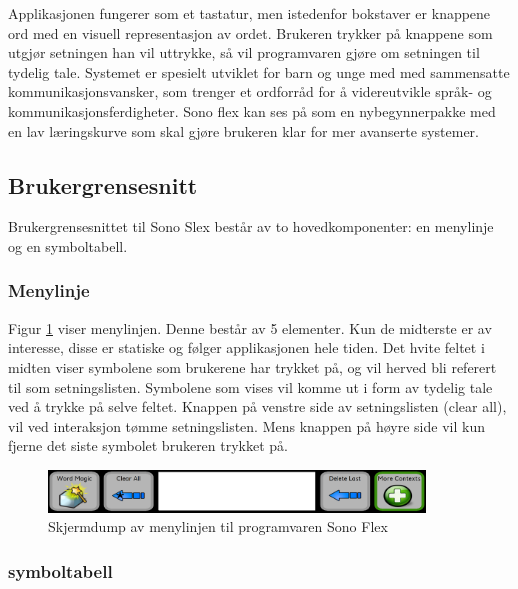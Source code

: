 \documentclass[phd,tocprelim]{cornell}
\begin{document}
Applikasjonen fungerer som et tastatur, men istedenfor bokstaver er knappene ord med en visuell representasjon av ordet. Brukeren trykker på knappene som utgjør setningen han vil uttrykke, så vil programvaren gjøre om setningen til tydelig tale.  Systemet er spesielt utviklet for barn og unge med med sammensatte kommunikasjonsvansker, som trenger et ordforråd for å videreutvikle språk- og kommunikasjonsferdigheter. Sono flex kan ses på som en nybegynnerpakke med en lav læringskurve som skal gjøre brukeren klar for mer avanserte systemer. 


\subsection{Brukergrensesnitt}

Brukergrensesnittet til Sono Slex består av to hovedkomponenter: en menylinje og en symboltabell. 


\subsubsection{Menylinje}

Figur \ref{fig:menylinje} viser menylinjen.  Denne består av 5 elementer.  Kun de midterste er av interesse, disse  er statiske og følger applikasjonen hele tiden. Det hvite feltet i midten viser symbolene som brukerene har trykket på, og vil herved bli referert til som setningslisten. Symbolene som vises vil komme ut i form av tydelig tale ved å trykke på selve feltet. Knappen på venstre side av setningslisten (clear all), vil ved interaksjon tømme setningslisten. Mens knappen på høyre side vil kun fjerne det siste symbolet brukeren trykket på.


\begin{figure}[ht!]
\centering
\includegraphics[width=100mm]{menylinje}
\caption{Skjermdump av menylinjen til programvaren Sono Flex}
\label{fig:menylinje}
\end{figure}




\subsubsection{symboltabell}
\label{subsubsec:symboltabell}
\end{document}
